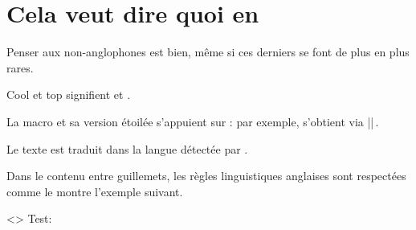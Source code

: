\documentclass{tutodoc}
\begin{document}
\section{Cela veut dire quoi en }

Penser aux non-anglophones est bien, même si ces derniers se font de plus en plus rares.

\begin{tdoclatex}
Cool et top signifient  et .
\end{tdoclatex}


La macro  et sa version étoilée s'appuient sur  : par exemple,  s'obtient via \tdoclatexin||\,.


\begin{tdocnote}
    Le texte  est traduit dans la langue détectée par \thisproj.
\end{tdocnote}


Dans le contenu entre guillemets, les règles linguistiques anglaises sont respectées comme le montre l'exemple suivant.

\begin{tdoclatex}<>
          Test:   \\
\end{tdoclatex}
\end{document}
